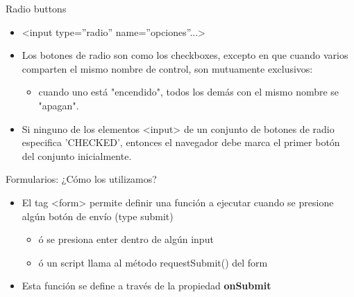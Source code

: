 \documentclass[aspectratio=43,10pt,t]{beamer}
\begin{document}
\begin{frame}{Radio buttons}\relax
\begin{minipage}[t]{0.458\paperwidth}
\begingroup
{}
\begin{itemize}
  \item\relax <input type=”radio” name=”opciones”...>
  \item\relax Los botones de radio son como los checkboxes, excepto en que cuando varios comparten el mismo nombre de control, son mutuamente exclusivos: 
  \begin{itemize}
    \item\relax cuando uno está "encendido", todos los demás con el mismo nombre se "apagan". 
  \end{itemize}
  \item\relax Si ninguno de los elementos \textcolor[HTML]{E50000}{<input>} de un conjunto de botones de radio especifica 'CHECKED', entonces el navegador debe marca el primer botón del conjunto inicialmente.
\end{itemize}
\endgroup
\end{minipage}
\end{frame}

\begin{frame}{Formularios: ¿Cómo los utilizamos?}\relax
\begin{minipage}[t]{0.424\paperwidth}
\begingroup
{}
\begin{itemize}
  \item\relax El tag \textcolor[HTML]{E50000}{<form>} permite definir una función a ejecutar cuando se presione algún botón de envío (type submit)
  \begin{itemize}
    \item\relax ó se presiona enter dentro de algún input
    \item\relax ó un script llama al método requestSubmit() del form
  \end{itemize}
  \item\relax Esta función se define a través de la propiedad \textbf{onSubmit}
\end{itemize}
\endgroup
\end{minipage}
\end{frame}
\end{document}
